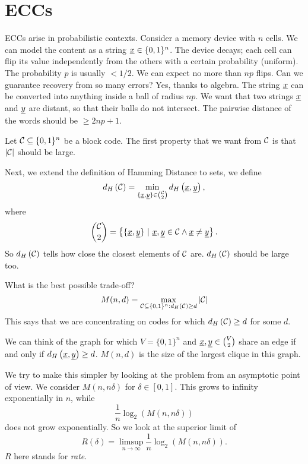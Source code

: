 
\chapter{\aclp{ECC}}

\acp{ECC} arise in probabilistic contexts.
Consider a memory device with $n$ cells.
We can model the content as a string $\underline{x} \in \{0, 1\}^n$.
The device decays; each cell can flip its value independently from the others with a certain probability (uniform).
The probability $p$ is usually $< 1/2$.
We can expect no more than $np$ flips.
Can we guarantee recovery from so many errors?
Yes, thanks to algebra.
The string $\underline{x}$ can be converted into anything inside a ball of radius $np$.
We want that two strings $\underline{x}$ and $\underline{y}$ are distant, so that their balls do not intersect.
The pairwise distance of the words should be $\ge 2np + 1$.

Let $\mathcal{C} \subseteq \{0, 1\}^n$ be a block code.
The first property that we want from $\mathcal{C}$ is that $\left|{\mathcal{C}}\right|$ should be large.

Next, we extend the definition of Hamming Distance to sets, \ie we define
\begin{equation*}
	d_H \left({\mathcal{C}}\right) = \min_{\{\underline{x}, \underline{y}\} \in \binom{\mathcal{C}}{2}} d_H \left({\underline{x}, \underline{y}}\right),
\end{equation*}
where 
\begin{equation*}
	\binom{\C}{2} = \left\{ \{\str{x}, \str{y}\}\ |\ \str{x}, \str{y} \in \C \land \str{x} \neq \str{y} \right\}. 
\end{equation*}
So $d_H \left({\mathcal{C}}\right)$ tells how close the closest elements of $\mathcal{C}$ are.
$d_H \left({\mathcal{C}}\right)$ should be large too.

What is the best possible trade-off?
\begin{equation*}
	M(n, d) = \max_{\mathcal{C} \subseteq \{0,1\}^{n} : d_H \left({\mathcal{C}}\right) \ge d} \left|{\mathcal{C}}\right|
\end{equation*}
This says that we are concentrating on codes for which $d_H \left({\mathcal{C}}\right) \ge d$ for some $d$.

We can think of the graph for which $V = \{0, 1\}^n$ and $\underline{x}, \underline{y} \in \binom{V}{2}$ share an edge if and only if $d_H \left({\underline{x}, \underline{y}}\right) \ge d$.
$M(n,d)$ is the size of the largest clique in this graph.

We try to make this simpler by looking at the problem from an asymptotic point of view.
We consider $M(n, n \delta)$ for $\delta \in [0, 1]$.
This grows to infinity exponentially in $n$, while
\begin{equation*}
	\frac{1}{n} \log_2 \left( M(n, n \delta) \right)
\end{equation*}
does not grow exponentially.
So we look at the superior limit of
\begin{equation*}
	R(\delta) = \limsup_{n \to \infty} \frac{1}{n} \log_2 \left( M(n, n \delta) \right).
\end{equation*}
$R$ here stands for \emph{rate}.

